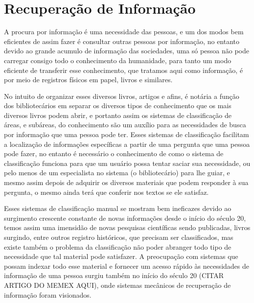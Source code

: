 \section{Recuperação de Informação} \label{sec:RecuperaçãoInformação}




A procura por informação é uma necessidade das pessoas, e um dos modos bem eficientes de assim fazer é consultar outras pessoas por informação, no entanto devido ao grande acumulo de informação das sociedades, uma só pessoa não pode carregar consigo todo o conhecimento da humanidade, para tanto um modo eficiente de transferir esse conhecimento, que tratamos aqui como informação, é por meio de registros físicos em papel, livros e similares.

No intuito de organizar esses diversos livros, artigos e afins, é notária a função dos bibliotecários em separar os diversos tipos de conhecimento que os mais diversos livros podem abrir, e portanto assim os sistemas de classificação de áreas, e subáreas, do conhecimento são um auxílio para as necessidades de busca por informação que uma pessoa pode ter. Esses sistemas de classificação facilitam a localização de informações específicas a partir de uma pergunta que uma pessoa pode fazer, no entanto é necessário o conhecimento de como o sistema de classificação funciona para que um usuário possa tentar saciar sua necessidade, ou pelo menos de um especialista no sistema (o bibliotecário) para lhe guiar, e mesmo assim depois de adquirir os diversos materiais que podem responder à sua pergunta, o mesmo ainda terá que conferir nos textos se ele satisfaz.


Esses sistemas de classificação manual se mostram bem ineficazes devido ao surgimento crescente constante de novas informações desde o início do século 20, temos assim uma imensidão de novas pesquisas científicas sendo publicadas, livros surgindo, entre outros registro históricos, que precisam ser classificados, mas existe também o problema da classificação não poder abranger todo tipo de necessidade que tal material pode satisfazer. A preocupação com sistemas que possam indexar todo esse material e fornecer um acesso rápido às necessidades de informação de uma pessoa surgiu também no início do século 20 (CITAR ARTIGO DO MEMEX AQUI), onde sistemas mecânicos de recuperação de informação foram visionados.


